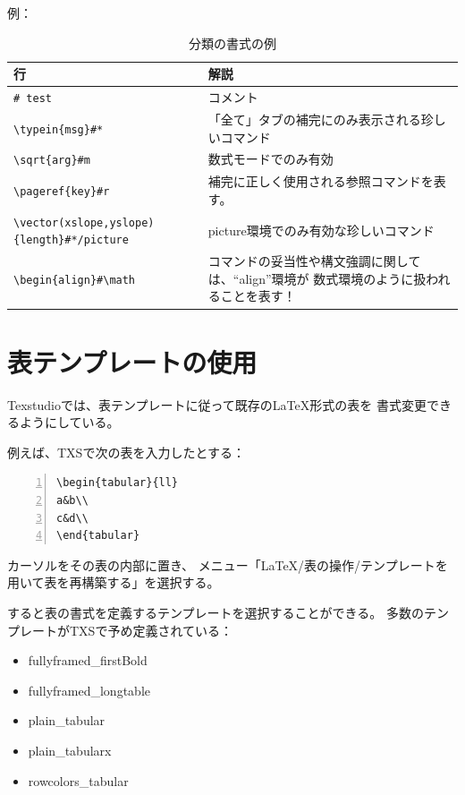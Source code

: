 例：

\begin{table}[H]
  \centering
  \caption{分類の書式の例}
  \begin{tabularx}{\linewidth}{lX}
    \hline
    \textbf{行} & \textbf{解説}\\
    \hline
    \verb+# test+ & コメント\\
    \verb+\typein+\verb+{msg}#*+ & 「全て」タブの補完にのみ表示される珍しいコマンド\\
    \verb+\sqrt+\verb+{arg}#m+ & 数式モードでのみ有効\\
    \verb+\pageref+\verb+{key}#r+ & 補完に正しく使用される参照コマンドを表す。\\
    \verb+\vector+\verb+(xslope,yslope){length}#*/picture+
      & picture環境でのみ有効な珍しいコマンド\\
    \verb+\begin+\verb+{align}#\math+
      & コマンドの妥当性や構文強調に関しては、``align''環境が
      数式環境のように扱われることを表す！\\
    \hline
  \end{tabularx}
\end{table}

\section{表テンプレートの使用}

Texstudioでは、表テンプレートに従って既存のLaTeX形式の表を
書式変更できるようにしている。

例えば、TXSで次の表を入力したとする：

\begin{lstlisting}[frame=single,numbers=left]
\begin{tabular}{ll}
a&b\\
c&d\\
\end{tabular}
\end{lstlisting}

カーソルをその表の内部に置き、
メニュー「LaTeX/表の操作/テンプレートを用いて表を再構築する」を選択する。

すると表の書式を定義するテンプレートを選択することができる。
多数のテンプレートがTXSで予め定義されている：

\begin{itemize}
\item
  fullyframed\_firstBold
\item
  fullyframed\_longtable
\item
  plain\_tabular
\item
  plain\_tabularx
\item
  rowcolors\_tabular
\end{itemize}

